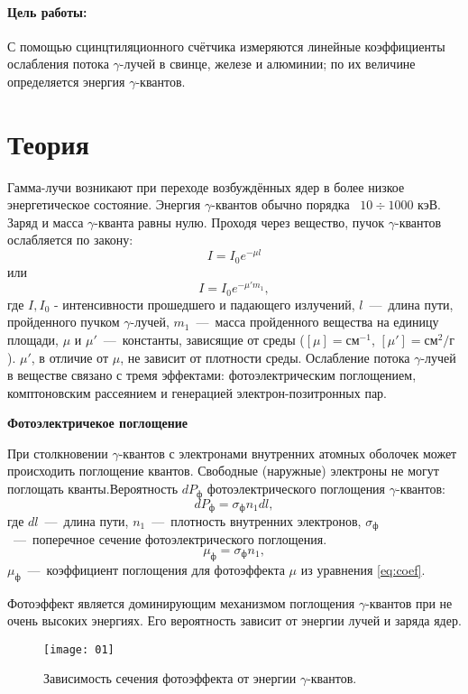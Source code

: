 \documentclass{physlab}
\begin{document}


\paragraph{Цель работы:} С помощью сцинцтиляционного счётчика измеряются линейные коэффициенты ослабления потока $\gamma$-лучей  в свинце, железе и алюминии; по их величине определяется энергия $\gamma$-квантов.

\section{Теория}
Гамма-лучи возникают при переходе возбуждённых ядер в более низкое энергетическое состояние. Энергия $\gamma$-квантов обычно порядка ~$10\div1000$ кэВ. Заряд и масса $\gamma$-кванта равны нулю. Проходя через вещество, пучок $\gamma$-квантов ослабляется по закону:
\begin{equation}
    I = I_0e^{-\mu l}
\label{eq:coef}
\end{equation} 
	или
\begin{equation}
    I=I_0e^{-\mu' m_1},
\end{equation}
где $I, I_0$ - интенсивности прошедшего и падающего излучений, $l$~---~длина пути, пройденного  пучком $\gamma$-лучей, $m_1$~---~масса пройденного вещества на единицу площади, $\mu$ и $\mu'$~---~константы, зависящие от среды ($[\mu] = \text{см}^{-1}$, $[\mu'] = \text{см}^{2}/\text{г}$). $\mu'$, в отличие от $\mu$, не зависит от плотности среды. Ослабление потока $\gamma$-лучей в веществе связано с тремя эффектами: фотоэлектрическим поглощением, комптоновским рассеянием и генерацией электрон-позитронных пар.

\textbf{Фотоэлектричекое поглощение}

	При столкновении $\gamma$-квантов с электронами внутренних атомных оболочек может происходить поглощение квантов. Свободные (наружные) электроны не могут поглощать кванты.Вероятность $dP_\text{ф}$ фотоэлектрического поглощения $\gamma$-квантов: 
\[ dP_\text{ф}=\sigma_\text{ф} n_1 dl, \]
	где $dl$~---~длина пути, $n_1$~---~плотность внутренних  электронов, $\sigma_\text{ф}$~---~поперечное сечение фотоэлектрического поглощения.
\[ \mu_\text{ф}=\sigma_\text{ф}n_1, \]	
	$\mu_\text{ф}$~---~коэффициент поглощения для фотоэффекта $\mu$ из уравнения \eqref{eq:coef}.
	
	Фотоэффект является доминирующим механизмом поглощения $\gamma$-квантов при не очень высоких энергиях. Его вероятность зависит от энергии лучей и заряда  ядер.
\begin{figure}[H]
\centering
    \texttt{[image: 01]}
\caption{Зависимость сечения фотоэффекта от энергии $\gamma$-квантов.}
\end{figure}
\end{document}
